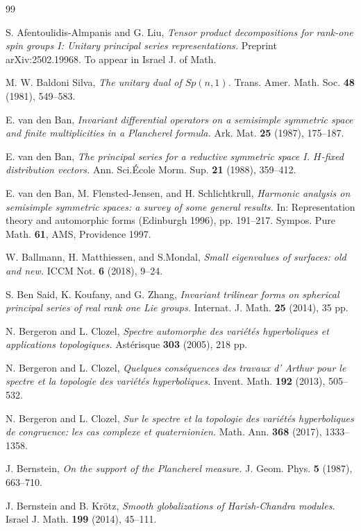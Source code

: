 \documentclass[10]{amsart}
\theoremstyle{remark}
\theoremstyle{definition}
\numberwithin{equation}{section}
\begin{document}
{\begin{thebibliography}{99}
\baselineskip=12pt

 S. Afentoulidis-Almpanis and G. Liu, {\it Tensor product decompositions for rank-one spin groups I: Unitary principal series representations.} Preprint arXiv:2502.19968. To appear in Israel J. of Math.

 M. W. Baldoni Silva, {\em The unitary dual of $Sp(n,1)$.}
 Trans. Amer. Math. Soc. {\bf 48}  (1981), 549--583.

 E. van den Ban, {\it Invariant differential operators on a semisimple symmetric space 
and finite multiplicities in a Plancherel formula.} Ark. Mat. {\bf 25} (1987), 175--187. 

 E. van den Ban, {\it The principal series for a reductive symmetric space I. $H$-fixed distribution vectors.} Ann. Sci.\' Ecole Morm. Sup. {\bf 21} (1988), 359--412. 

 E. van den Ban, M. Flensted-Jensen, and H. Schlichtkrull, {\it Harmonic analysis on semisimple symmetric spaces: a survey of some general results.} In: Representation theory and automorphic forms (Edinburgh 1996), pp. 191--217. Sympos. Pure Math. {\bf 61}, AMS, Providence 1997. 

 W. Ballmann, H. Matthiessen, and S.Mondal,  {\it Small eigenvalues of surfaces: old and new.} ICCM Not. {\bf 6} (2018), 9--24.

 S. Ben Said, K. Koufany, and G. Zhang, {\it Invariant trilinear forms on spherical principal series of real rank one Lie groups.} Internat. J. Math. {\bf 25} (2014), 35 pp.

 N. Bergeron and L. Clozel, {\it Spectre automorphe des vari\' et\' es hyperboliques et applications topologiques.} Ast\' erisque {\bf 303} (2005), 218 pp. 

 N. Bergeron and L. Clozel, {\it Quelques cons\' equences des travaux d' Arthur pour le spectre et la topologie des vari\' et\' es hyperboliques.} Invent. Math. {\bf 192} (2013), 505--532. 

 N. Bergeron and L. Clozel, {\it Sur le spectre et la topologie des vari\' et\' es hyperboliques de congruence: les cas complexe et quaternionien.} Math. Ann. {\bf 368} (2017), 1333--1358. 

 J. Bernstein, {\it On the support of the Plancherel measure.} J. Geom. Phys. {\bf 5} (1987), 663--710. 

  J. Bernstein and B. Kr\"otz, {\it Smooth globalizations of Harish-Chandra modules.} Israel J. Math. {\bf 199} (2014), 45--111. 


\end{thebibliography}}
\end{document}
